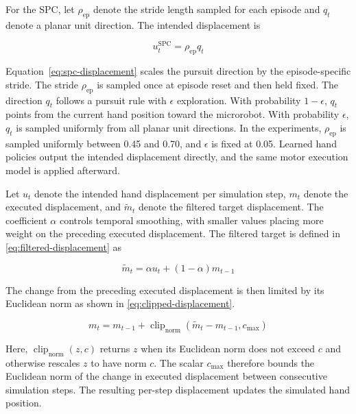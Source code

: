 \documentclass[lettersize,journal]{IEEEtran}
\begin{document}
For the SPC, let $\rho_{\mathrm{ep}}$ denote the stride length sampled for each episode and $q_t$ denote a planar unit direction. The intended displacement is

\begin{equation}
u_t^{\mathrm{SPC}} = \rho_{\mathrm{ep}} q_t
\label{eq:spc-displacement}
\end{equation}

Equation~\eqref{eq:spc-displacement} scales the pursuit direction by the episode-specific stride. The stride $\rho_{\mathrm{ep}}$ is sampled once at episode reset and then held fixed. The direction $q_t$ follows a pursuit rule with $\epsilon$ exploration. With probability $1-\epsilon$, $q_t$ points from the current hand position toward the microrobot. With probability $\epsilon$, $q_t$ is sampled uniformly from all planar unit directions. In the experiments, $\rho_{\mathrm{ep}}$ is sampled uniformly between 0.45 and 0.70, and $\epsilon$ is fixed at 0.05. Learned hand policies output the intended displacement directly, and the same motor execution model is applied afterward.

Let $u_t$ denote the intended hand displacement per simulation step, $m_t$ denote the executed displacement, and $\widetilde{m}_t$ denote the filtered target displacement. The coefficient $\alpha$ controls temporal smoothing, with smaller values placing more weight on the preceding executed displacement. The filtered target is defined in \eqref{eq:filtered-displacement} as

\begin{equation}
\widetilde{m}_t = \alpha u_t + (1-\alpha)m_{t-1}
\label{eq:filtered-displacement}
\end{equation}

The change from the preceding executed displacement is then limited by its Euclidean norm as shown in \eqref{eq:clipped-displacement}.

\begin{equation}
m_t = m_{t-1}
+ \operatorname{clip}_{\mathrm{norm}}
  \!\left(\widetilde{m}_t-m_{t-1},c_{\max}\right)
\label{eq:clipped-displacement}
\end{equation}

Here, $\operatorname{clip}_{\mathrm{norm}}(z,c)$ returns $z$ when its Euclidean norm does not exceed $c$ and otherwise rescales $z$ to have norm $c$. The scalar $c_{\max}$ therefore bounds the Euclidean norm of the change in executed displacement between consecutive simulation steps. The resulting per-step displacement updates the simulated hand position.
\end{document}
